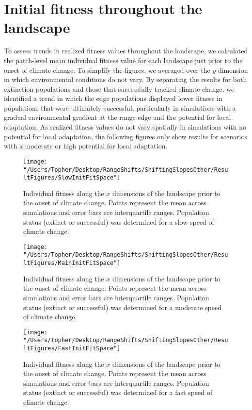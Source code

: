 \documentclass[12pt, oneside]{article}
\begin{document}
\section*{Initial fitness throughout the landscape}
To assess trends in realized fitness values throughout the landscape, we calculated the patch-level mean individual fitness value for each landscape just prior to the onset of climate change. To simplify the figures, we averaged over the $y$ dimension in which environmental conditions do not vary. By separating the results for both extinction populations and those that successfully tracked climate change, we identified a trend in which the edge populations displayed lower fitness in populations that were ultimately successful, particularly in simulations with a gradual environmental gradient at the range edge and the potential for local adaptation. As realized fitness values do not vary spatially in simulations with no potential for local adaptation, the following figures only show results for scenarios with a moderate or high potential for local adaptation.

\begin{figure}
\centering
\texttt{[image: "/Users/Topher/Desktop/RangeShifts/ShiftingSlopesOther/ResultFigures/SlowInitFitSpace"]}
\vspace{-5mm}
\caption[LoF entry]{Individual fitness along the $x$ dimensions of the landscape prior to the onset of climate change. Points represent the mean across simulations and error bars are interquartile ranges. Population status (extinct or successful) was determined for a slow speed of climate change.}
\label{fig:InitFitSlow}
\end{figure}

\begin{figure}
\centering
\texttt{[image: "/Users/Topher/Desktop/RangeShifts/ShiftingSlopesOther/ResultFigures/MainInitFitSpace"]}
\caption[LoF entry]{Individual fitness along the $x$ dimensions of the landscape prior to the onset of climate change. Points represent the mean across simulations and error bars are interquartile ranges. Population status (extinct or successful) was determined for a moderate speed of climate change.}
\vspace{-5mm}
\label{fig:InitFit}
\end{figure}

\begin{figure}
\centering
\texttt{[image: "/Users/Topher/Desktop/RangeShifts/ShiftingSlopesOther/ResultFigures/FastInitFitSpace"]}
\vspace{-5mm}
\caption[LoF entry]{Individual fitness along the $x$ dimensions of the landscape prior to the onset of climate change. Points represent the mean across simulations and error bars are interquartile ranges. Population status (extinct or successful) was determined for a fast speed of climate change.}
\label{fig:InitFitFast}
\end{figure}
\end{document}

